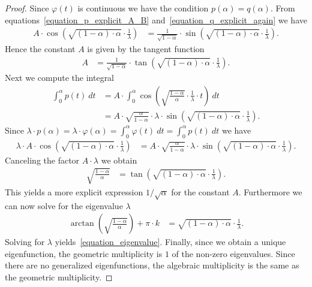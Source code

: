 \documentclass[10pt,a4paper]{amsart}
\begin{document}
\begin{proof}
Since $\varphi(t)$ is continuous we have
the condition $p(\alpha) = q(\alpha)$.
From equations~\eqref{equation_p_explicit_A_B}
and~\eqref{equation_q_explicit_again}
we have
\begin{align*}
A \cdot \cos\left( \sqrt{(1-\alpha) \cdot \alpha} \cdot \frac{1}{\lambda} \right)
& =
\frac{1}{\sqrt{1-\alpha}}
\cdot
\sin\left( \sqrt{(1-\alpha) \cdot \alpha} \cdot \frac{1}{\lambda} \right) .
\end{align*}
Hence the constant $A$ is given by the tangent function
\begin{align*}
A
& =
\frac{1}{\sqrt{1-\alpha}}
\cdot
\tan\left( \sqrt{(1-\alpha) \cdot \alpha} \cdot \frac{1}{\lambda} \right) .
\end{align*}
Next we compute the integral
\begin{align*}
\int_{0}^{\alpha} p(t) \: dt
& =
A \cdot 
\int_{0}^{\alpha} 
\cos\left( \sqrt{\frac{1-\alpha}{\alpha}} \cdot \frac{1}{\lambda} \cdot  t \right)
\: dt
\\
& =
A \cdot 
\sqrt{\frac{\alpha}{1-\alpha}} \cdot \lambda \cdot
\sin\left( \sqrt{(1-\alpha) \cdot \alpha} \cdot \frac{1}{\lambda} \right) .
\end{align*}
Since
$\lambda \cdot p(\alpha)
= \lambda \cdot \varphi(\alpha)
= \int_{0}^{\alpha} \varphi(t) \: dt
= \int_{0}^{\alpha} p(t) \: dt$
we have
\begin{align*}
\lambda \cdot
A \cdot \cos\left( \sqrt{(1-\alpha) \cdot \alpha} \cdot \frac{1}{\lambda} \right)
& =
A \cdot 
\sqrt{\frac{\alpha}{1-\alpha}} \cdot \lambda \cdot
\sin\left( \sqrt{(1-\alpha) \cdot \alpha} \cdot \frac{1}{\lambda} \right).
\end{align*}
Canceling the factor $A \cdot \lambda$
we obtain
\begin{align*}
\sqrt{\frac{1-\alpha}{\alpha}}
& =
\tan\left( \sqrt{(1-\alpha) \cdot \alpha} \cdot \frac{1}{\lambda} \right) .
\end{align*}
This yields a more explicit expression
$1/\sqrt{\alpha}$ for the constant $A$.
Furthermore we can now solve for the eigenvalue $\lambda$
\begin{align*}
\arctan\left(\sqrt{\frac{1-\alpha}{\alpha}}\right)
+
\pi \cdot k
& =
\sqrt{(1-\alpha) \cdot \alpha} \cdot \frac{1}{\lambda} .
\end{align*}
Solving for $\lambda$ yields~\eqref{equation_eigenvalue}.
Finally, since we obtain a unique eigenfunction,
the geometric multiplicity is $1$ of the non-zero eigenvalues.
Since there are no generalized eigenfunctions,
the algebraic multiplicity is the same as the geometric multiplicity.
\end{proof}
\end{document}
